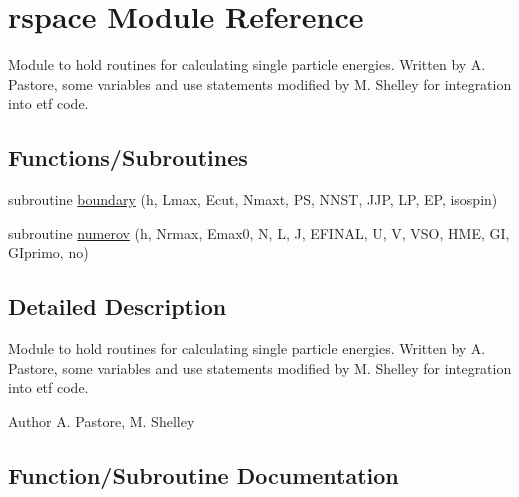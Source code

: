 \hypertarget{namespacerspace}{}\section{rspace Module Reference}
\label{namespacerspace}


Module to hold routines for calculating single particle energies. Written by A. Pastore, some variables and use statements modified by M. Shelley for integration into etf code.  


\subsection*{Functions/\+Subroutines}
\begin{DoxyCompactItemize}
\item 
subroutine \mbox{\hyperlink{namespacerspace_af32fb6df1b49e330db5a70e2b05faa5b}{boundary}} (h, Lmax, Ecut, Nmaxt, PS, N\+N\+ST, J\+JP, LP, EP, isospin)
\item 
subroutine \mbox{\hyperlink{namespacerspace_a95f8e6b75776b923eb4ab9cc71a3be33}{numerov}} (h, Nrmax, Emax0, N, L, J, E\+F\+I\+N\+AL, U, V, V\+SO, H\+ME, GI, G\+Iprimo, no)
\end{DoxyCompactItemize}


\subsection{Detailed Description}
Module to hold routines for calculating single particle energies. Written by A. Pastore, some variables and use statements modified by M. Shelley for integration into etf code. 

\begin{DoxyAuthor}{Author}
A. Pastore, M. Shelley 
\end{DoxyAuthor}


\subsection{Function/\+Subroutine Documentation}
\mbox{\label{namespacerspace_af32fb6df1b49e330db5a70e2b05faa5b}} 

